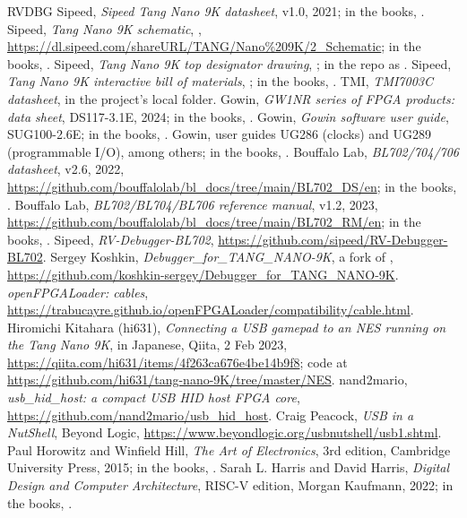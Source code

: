 \documentclass[11pt,a4paper]{article}
\begin{document}
\raggedright
\begin{thebibliography}{RVDBG}
 Sipeed, \textit{Sipeed Tang Nano 9K datasheet}, v1.0, 2021;  in the books, .
 Sipeed, \textit{Tang Nano 9K schematic}, , \url{https://dl.sipeed.com/shareURL/TANG/Nano%209K/2_Schematic}; in the books, \name{Tang Nano 9K}.
 Sipeed, \textit{Tang Nano 9K top designator drawing}, ; in the repo as .
 Sipeed, \textit{Tang Nano 9K interactive bill of materials}, ; in the books, .
 TMI, \textit{TMI7003C datasheet},  in the project’s local folder.
 Gowin, \textit{GW1NR series of FPGA products: data sheet}, DS117-3.1E, 2024;  in the books, .
 Gowin, \textit{Gowin software user guide}, SUG100-2.6E; in the books, .
 Gowin, user guides UG286 (clocks) and UG289 (programmable I/O), among others; in the books, .
 Bouffalo Lab, \textit{BL702/704/706 datasheet}, v2.6, 2022, \url{https://github.com/bouffalolab/bl_docs/tree/main/BL702_DS/en}; in the books, .
 Bouffalo Lab, \textit{BL702/BL704/BL706 reference manual}, v1.2, 2023, \url{https://github.com/bouffalolab/bl_docs/tree/main/BL702_RM/en}; in the books, .
 Sipeed, \textit{RV-Debugger-BL702}, \url{https://github.com/sipeed/RV-Debugger-BL702}.
 Sergey Koshkin, \textit{Debugger\_for\_TANG\_NANO-9K}, a fork of , \url{https://github.com/koshkin-sergey/Debugger_for_TANG_NANO-9K}.
 \textit{openFPGALoader: cables}, \url{https://trabucayre.github.io/openFPGALoader/compatibility/cable.html}.
 Hiromichi Kitahara (hi631), \textit{Connecting a USB gamepad to an NES running on the Tang Nano 9K}, in Japanese, Qiita, 2 Feb 2023, \url{https://qiita.com/hi631/items/4f263ca676e4be14b9f8}; code at \url{https://github.com/hi631/tang-nano-9K/tree/master/NES}.
 nand2mario, \textit{usb\_hid\_host: a compact USB HID host FPGA core}, \url{https://github.com/nand2mario/usb_hid_host}.
 Craig Peacock, \textit{USB in a NutShell}, Beyond Logic, \url{https://www.beyondlogic.org/usbnutshell/usb1.shtml}.
 Paul Horowitz and Winfield Hill, \textit{The Art of Electronics}, 3rd edition, Cambridge University Press, 2015;  in the books, .
 Sarah L. Harris and David Harris, \textit{Digital Design and Computer Architecture}, RISC-V edition, Morgan Kaufmann, 2022;  in the books, .
\end{thebibliography}

\revisiontable
\end{document}
